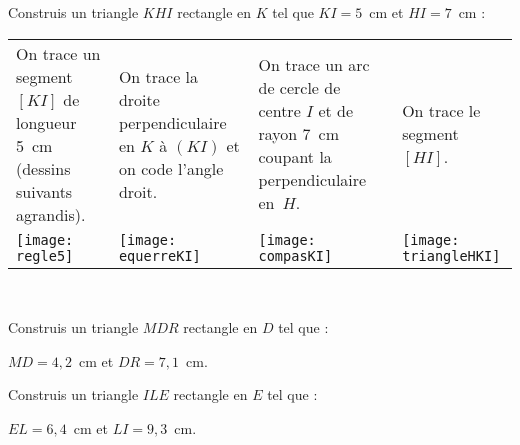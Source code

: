 
\begin{methode*1}

\begin{exemple*1}
Construis un triangle $KHI$ rectangle en $K$ tel que $KI = 5$ cm et $HI = 7$ cm : \\[1em]
\begin{tabularx}{\textwidth}{X|X|X|X}
 On trace un segment $[KI]$ de longueur 5 cm (dessins suivants agrandis). & On trace la droite perpendiculaire en $K$ à $(KI)$ et on code l'angle droit. & On trace un arc de cercle de centre $I$ et de rayon 7 cm coupant la perpendiculaire en $H$. & On trace le segment $[HI]$.\\
 \texttt{[image: regle5]} & \texttt{[image: equerreKI]} & \texttt{[image: compasKI]} & \texttt{[image: triangleHKI]} \\ 
\end{tabularx} \\

\end{exemple*1}

\exercice 
Construis un triangle $MDR$ rectangle en $D$ tel que :

$MD = 4,2$ cm et $DR = 7,1$ cm. 
\vspace{4cm}
 
\exercice
Construis un triangle $ILE$ rectangle en $E$ tel que :

$EL = 6,4$ cm et $LI = 9,3$ cm.
\vspace{2cm}
 
\end{methode*1}


